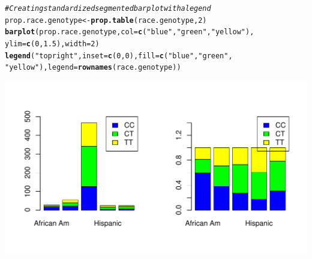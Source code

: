 \documentclass[11pt]{article}\usepackage[]{graphicx}\usepackage[]{color}
\makeatletter
\def\maxwidth{ %
  \ifdim\Gin@nat@width>\linewidth
    \linewidth
  \else
    \Gin@nat@width
  \fi
}
\newcommand{\hlnum}[1]{\textcolor[rgb]{0.686,0.059,0.569}{#1}}%
\newcommand{\hlstr}[1]{\textcolor[rgb]{0.192,0.494,0.8}{#1}}%
\newcommand{\hlcom}[1]{\textcolor[rgb]{0.678,0.584,0.686}{\textit{#1}}}%
\newcommand{\hlstd}[1]{\textcolor[rgb]{0.345,0.345,0.345}{#1}}%
\newcommand{\hlkwb}[1]{\textcolor[rgb]{0.69,0.353,0.396}{#1}}%
\newcommand{\hlkwc}[1]{\textcolor[rgb]{0.333,0.667,0.333}{#1}}%
\newcommand{\hlkwd}[1]{\textcolor[rgb]{0.737,0.353,0.396}{\textbf{#1}}}%
\newenvironment{kframe}{%
 \def\at@end@of@kframe{}%
 \ifinner\ifhmode%
  \def\at@end@of@kframe{\end{minipage}}%
  \begin{minipage}{\columnwidth}%
 \fi\fi%
 \def\FrameCommand##1{\hskip\@totalleftmargin \hskip-\fboxsep
 \colorbox{shadecolor}{##1}\hskip-\fboxsep
     \hskip-\linewidth \hskip-\@totalleftmargin \hskip\columnwidth}%
 \MakeFramed {\advance\hsize-\width
   \@totalleftmargin\z@ \linewidth\hsize
   \@setminipage}}%
 {\par\unskip\endMakeFramed%
 \at@end@of@kframe}
\newenvironment{knitrout}{}{} %
\makeatother
\begin{document}
\begin{knitrout}
\begin{kframe}
\begin{alltt}
\hlcom{# Creating standardized segmented bar plot with a legend}
\hlstd{prop.race.genotype} \hlkwb{<-} \hlkwd{prop.table}\hlstd{(race.genotype,} \hlnum{2}\hlstd{)}
\hlkwd{barplot}\hlstd{(prop.race.genotype,} \hlkwc{col} \hlstd{=} \hlkwd{c}\hlstd{(}\hlstr{"blue"}\hlstd{,} \hlstr{"green"}\hlstd{,} \hlstr{"yellow"}\hlstd{),}
    \hlkwc{ylim} \hlstd{=} \hlkwd{c}\hlstd{(}\hlnum{0}\hlstd{,} \hlnum{1.5}\hlstd{),} \hlkwc{width} \hlstd{=} \hlnum{2}\hlstd{)}
\hlkwd{legend}\hlstd{(}\hlstr{"topright"}\hlstd{,} \hlkwc{inset} \hlstd{=} \hlkwd{c}\hlstd{(}\hlnum{0}\hlstd{,} \hlnum{0}\hlstd{),} \hlkwc{fill} \hlstd{=} \hlkwd{c}\hlstd{(}\hlstr{"blue"}\hlstd{,} \hlstr{"green"}\hlstd{,}
    \hlstr{"yellow"}\hlstd{),} \hlkwc{legend} \hlstd{=} \hlkwd{rownames}\hlstd{(race.genotype))}
\end{alltt}
\end{kframe}
\includegraphics[width=\maxwidth]{figure/unnamed-chunk-30-1} 

\end{knitrout}
\end{document}
